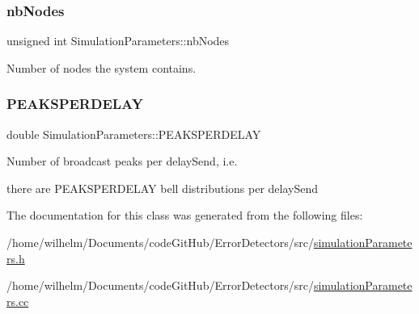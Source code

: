 \subsubsection{\texorpdfstring{nb\+Nodes}{nbNodes}}
{\footnotesize\ttfamily unsigned int Simulation\+Parameters\+::nb\+Nodes}



Number of nodes the system contains. 

\mbox{\label{class_simulation_parameters_a57cd536ac7c057b5c2d5c85faa4d846d}} 
\subsubsection{\texorpdfstring{P\+E\+A\+K\+S\+P\+E\+R\+D\+E\+L\+AY}{PEAKSPERDELAY}}
{\footnotesize\ttfamily double Simulation\+Parameters\+::\+P\+E\+A\+K\+S\+P\+E\+R\+D\+E\+L\+AY}



Number of broadcast peaks per delay\+Send, i.\+e. 

there are P\+E\+A\+K\+S\+P\+E\+R\+D\+E\+L\+AY bell distributions per delay\+Send 

The documentation for this class was generated from the following files\+:\begin{DoxyCompactItemize}
\item 
/home/wilhelm/\+Documents/code\+Git\+Hub/\+Error\+Detectors/src/\hyperlink{simulation_parameters_8h}{simulation\+Parameters.\+h}\item 
/home/wilhelm/\+Documents/code\+Git\+Hub/\+Error\+Detectors/src/\hyperlink{simulation_parameters_8cc}{simulation\+Parameters.\+cc}\end{DoxyCompactItemize}
